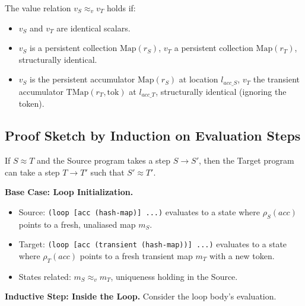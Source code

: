 \documentclass[sigplan,review,anonymous]{acmart}
\begin{document}
The value relation $v_S \approx_v v_T$ holds if:
\begin{itemize}
    \item $v_S$ and $v_T$ are identical scalars.
    \item $v_S$ is a persistent collection $\text{Map}(r_S)$, $v_T$ a persistent collection $\text{Map}(r_T)$, structurally identical.
    \item $v_S$ is the persistent accumulator $\text{Map}(r_S)$ at location $l_{acc\_S}$, $v_T$ the transient accumulator $\text{TMap}(r_T, \text{tok})$ at $l_{acc\_T}$, structurally identical (ignoring the token).
\end{itemize}

\subsection{Proof Sketch by Induction on Evaluation Steps}

If $S \approx T$ and the Source program takes a step $S \rightarrow S'$, then the Target program can take a step $T \rightarrow T'$ such that $S' \approx T'$.

\textbf{Base Case: Loop Initialization.}
\begin{itemize}
    \item Source: \texttt{(loop [acc (hash-map)] ...)} evaluates to a state where $\rho_S(acc)$ points to a fresh, unaliased map $m_S$.
    \item Target: \texttt{(loop [acc (transient (hash-map))] ...)} evaluates to a state where $\rho_T(acc)$ points to a fresh transient map $m_T$ with a new token.
    \item States related: $m_S \approx_v m_T$, uniqueness holding in the Source.
\end{itemize}

\textbf{Inductive Step: Inside the Loop.} Consider the loop body's evaluation.
\end{document}
